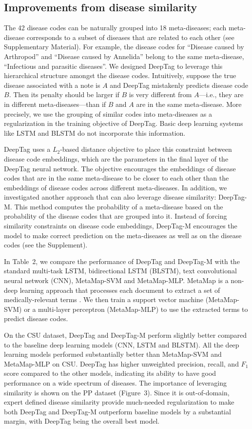\documentclass{article}[11pt,oneside]
\begin{document}
\subsection*{Improvements from disease similarity}
The 42 disease codes can be naturally grouped into 18 meta-diseases; each meta-disease corresponds to a subset of diseases that are related to each other (see Supplementary Material). For example, the disease codes for ``Disease caused by Arthropod'' and ``Disease caused by Annelida'' belong to the same meta-disease, ``Infectious and parasitic diseases''. We designed DeepTag to leverage this hierarchical structure amongst the disease codes. Intuitively, suppose the true disease associated with a note is $A$ and DeepTag mistakenly predicts disease code $B$. Then its penalty should be larger if $B$ is very different from $A$---i.e., they are in different meta-diseases---than if $B$ and $A$ are in the same meta-disease. More precisely, we use the grouping of similar codes into meta-diseases as a regularization in the training objective of DeepTag. Basic deep learning systems like LSTM and BLSTM do not incorporate this information.

DeepTag uses a $L_2$-based distance objective to place this constraint between disease code embeddings, which are the parameters in the final layer of the DeepTag neural network. The objective encourages the embeddings of disease codes that are in the same meta-disease to be closer to each other than the embeddings of disease codes across different meta-diseases. In addition, we investigated another approach that can also leverage disease similarity: DeepTag-M. This method computes the probability of a meta-disease based on the probability of the disease codes that are grouped into it. Instead of forcing similarity constraints on disease code embeddings, DeepTag-M encourages the model to make correct prediction on the meta-diseases as well as on the disease codes (see the Supplement).

In Table~2, we compare the performance of DeepTag and DeepTag-M with the standard multi-task LSTM, bidirectional LSTM (BLSTM), text convolutional neural network (CNN), MetaMap-SVM and MetaMap-MLP. MetaMap is a non-deep learning approach that processes each document to extract a set of medically-relevant terms \cite{aronson2010overview}. We then train a support vector machine (MetaMap-SVM) or a multi-layer perceptron (MetaMap-MLP) to use the extracted terms to predict disease codes.

On the CSU dataset, DeepTag and DeepTag-M perform slightly better  compared to the baseline deep learning models (CNN, LSTM and BLSTM). All the deep learning models performed substantially better than MetaMap-SVM and MetaMap-MLP on CSU. DeepTag has higher unweighted precision, recall, and $F_1$ score compared to the other models, indicating its ability to have good performance on a wide spectrum of diseases. The importance of leveraging similarity is shown on the PP dataset (Figure~3).  Since it is out-of-domain, expert defined disease similarity provide much-needed regularization to make both DeepTag and DeepTag-M outperform baseline models by a substantial margin, with DeepTag being the overall best model. 
\end{document}
